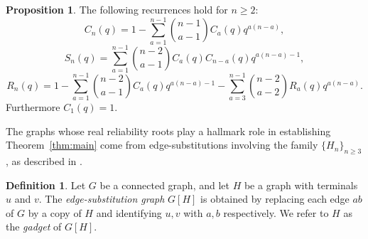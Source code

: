 \documentclass[12pt]{amsart}
\theoremstyle{definition}
\newtheorem{proposition}[theorem]{Proposition}
\newtheorem{definition}[theorem]{Definition}
\begin{document}
\begin{proposition}\label{prop:recurrences}
The following recurrences hold for $n \geq 2$:
\begin{equation}\label{eq:complete-rec}
C_n(q)=1-\sum_{a=1}^{n-1} \binom{n-1}{a-1}C_a(q)q^{a(n-a)},   
\end{equation}
\begin{equation}\label{eq:split-rec}
S_n(q)=\sum_{a=1}^{n-1} \binom{n-2}{a-1} C_a(q)C_{n-a}(q)q^{a(n-a)-1},
\end{equation}
\begin{equation}\label{eq:rminus-rec}
R_n(q)=1 - \sum_{a=1}^{n-1} \binom{n-2}{a-1} C_a(q) q^{a(n-a)-1} - \sum_{a=3}^{n-1} \binom{n-2}{a-2} R_a(q) q^{a(n-a)}.
\end{equation}
Furthermore $C_1(q)=1$.
\end{proposition}

The graphs whose real reliability roots play a hallmark role in establishing Theorem~\ref{thm:main} come from edge-substitutions involving the family $\{H_n\}_{n \geq 3}$, as described in \cite{BrownMol2017}.

\begin{definition}
Let $G$ be a connected graph, and let $H$ be a graph with terminals $u$ and $v$. The \emph{edge-substitution graph} $G[H]$ is obtained by replacing each edge $ab$ of $G$ by a copy of $H$ and identifying $u,v$ with $a,b$ respectively. We refer to $H$ as the \emph{gadget} of $G[H]$.
\end{definition}
\end{document}
